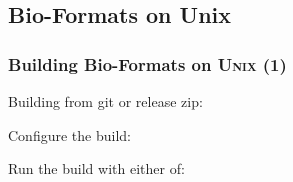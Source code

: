 \documentclass{beamer}
\begin{document}
\subsection{Bio-Formats on Unix}

\begin{frame}[fragile]
  \frametitle{Building Bio-Formats on U\textsc{nix} (1)}
  \scriptsize
  Building from git or release zip:

  Configure the build:

  \begin{semiverbatim}
\end{semiverbatim}

Run the build with either of:

  \begin{semiverbatim}
\end{semiverbatim}
\end{frame}
\end{document}
